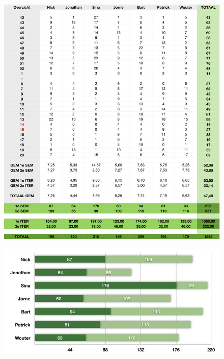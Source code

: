 \documentclass[salesmen, twoside]{../../../templates/latex/2009/softproj}
\begin{document}
\begin{projdoc}
\begin{figure}[h]
	\begin{center}
	\includegraphics[width=13cm]{../../img/timesheet-table.jpg}
	\end{center}
\end{figure}

\begin{figure}[h]
	\begin{center}
	\includegraphics[width=15cm]{../../img/timesheet-bars.jpg}
	\end{center}
\end{figure}


\end{projdoc}
\end{document}
